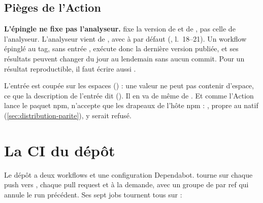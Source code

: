 \subsection{Pièges de l'Action}

\begin{piege}
\textbf{L'épingle ne fixe pas l'analyseur.}
 fixe la version de  et de , pas celle de l'analyseur. L'analyseur vient de , avec  à  par défaut (, l.~18--21). Un workflow épinglé au tag, sans entrée , exécute donc la dernière version publiée, et ses résultats peuvent changer du jour au lendemain sans aucun commit. Pour un résultat reproductible, il faut écrire aussi .
\end{piege}

\begin{piege}
L'entrée  est coupée sur les espaces () : une valeur ne peut pas contenir d'espace, ce que la description de l'entrée dit (). Il en va de même de . Et comme l'Action lance le paquet npm,  n'accepte que les drapeaux de l'hôte npm : , propre au natif (\cref{sec:distribution-parite}), y serait refusé.
\end{piege}

\section{La CI du dépôt}
\label{sec:distribution-ci}

Le dépôt a deux workflows et une configuration Dependabot.  tourne sur chaque push vers , chaque pull request et à la demande, avec un groupe de  par ref qui annule le run précédent. Ses sept jobs tournent tous sur  :

